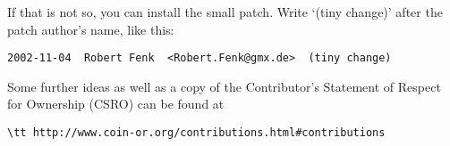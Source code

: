 If that is not so, you can install the small patch. Write ‘(tiny change)’ after the patch author’s name, like this:
 
\begin{verbatim}
2002-11-04  Robert Fenk  <Robert.Fenk@gmx.de>  (tiny change)
\end{verbatim}

\medskip

Some further ideas as well as a copy of the Contributor's Statement of Respect for Ownership (CSRO)
can be found at %
\begin{verbatim}
\tt http://www.coin-or.org/contributions.html#contributions
\end{verbatim}